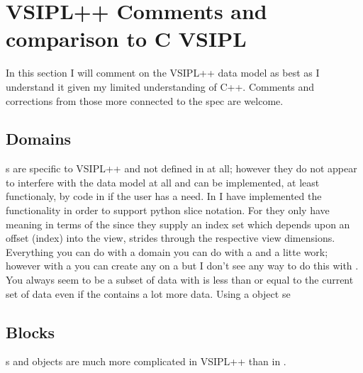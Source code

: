 \section{VSIPL++ Comments and comparison to C VSIPL}
In this section I will comment on the VSIPL++ data model as best as I understand it given my limited understanding of C++.  Comments and corrections from those more connected to the spec are welcome.
\subsection{Domains}
s are specific to VSIPL++ and not defined in \cvl{} at all; however they do not appear to interfere with the data model at all and can be implemented, at least functionaly, by  code in \cvl{} if the user has a need. In \pyjv{} I have implemented the functionality in order to support python slice notation.  For \cvl{} they only have meaning in terms of the \vw{} since they supply an index set which depends upon an offset (index) into the view, strides through the respective view dimensions.
\\[6pt]
Everything you can do with a domain you can do with a  and a litte work; however with a  you can create any \vw{} on a \blk{} but I don't see any way to do this with .  You always seem to be a subset of data with is less than or equal to the current set of data even if the \blk{} contains a lot more data.
Using a  object se 
\subsection{Blocks}
\Blk{}s and \Blk{} objects are much more complicated in VSIPL++ than in \cvl{}.